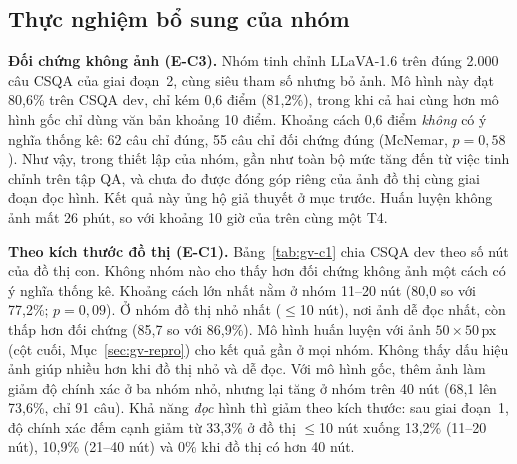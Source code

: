 \subsection{Thực nghiệm bổ sung của nhóm}
\textbf{Đối chứng không ảnh (E-C3).} Nhóm tinh chỉnh LLaVA-1.6 trên đúng 2.000 câu CSQA của giai đoạn~2, cùng siêu tham số nhưng bỏ ảnh. Mô hình này đạt 80,6\% trên CSQA dev, chỉ kém \GV{} 0,6 điểm (81,2\%), trong khi cả hai cùng hơn mô hình gốc chỉ dùng văn bản khoảng 10 điểm. Khoảng cách 0,6 điểm \emph{không} có ý nghĩa thống kê: 62 câu chỉ \GV{} đúng, 55 câu chỉ đối chứng đúng (McNemar, $p=0{,}58$). Như vậy, trong thiết lập của nhóm, gần như toàn bộ mức tăng đến từ việc tinh chỉnh trên tập QA, và chưa đo được đóng góp riêng của ảnh đồ thị cùng giai đoạn đọc hình. Kết quả này ủng hộ giả thuyết ở mục trước. Huấn luyện không ảnh mất 26 phút, so với khoảng 10 giờ của \GV{} trên cùng một T4.

\textbf{Theo kích thước đồ thị (E-C1).} Bảng~\ref{tab:gv-c1} chia CSQA dev theo số nút của đồ thị con. Không nhóm nào cho thấy \GV{} hơn đối chứng không ảnh một cách có ý nghĩa thống kê. Khoảng cách lớn nhất nằm ở nhóm 11--20 nút (80,0 so với 77,2\%; $p=0{,}09$). Ở nhóm đồ thị nhỏ nhất ($\le$10 nút), nơi ảnh dễ đọc nhất, \GV{} còn thấp hơn đối chứng (85,7 so với 86,9\%). Mô hình huấn luyện với ảnh $50\times50$\,px (cột cuối, Mục~\ref{sec:gv-repro}) cho kết quả gần \GV{} ở mọi nhóm. Không thấy dấu hiệu ảnh giúp nhiều hơn khi đồ thị nhỏ và dễ đọc. Với mô hình gốc, thêm ảnh làm giảm độ chính xác ở ba nhóm nhỏ, nhưng lại tăng ở nhóm trên 40 nút (68,1 lên 73,6\%, chỉ 91 câu). Khả năng \emph{đọc} hình thì giảm theo kích thước: sau giai đoạn~1, độ chính xác đếm cạnh giảm từ 33,3\% ở đồ thị $\le$10 nút xuống 13,2\% (11--20 nút), 10,9\% (21--40 nút) và 0\% khi đồ thị có hơn 40 nút.

\begin{table}[t]
\centering
\caption{Độ chính xác CSQA dev theo số nút của đồ thị con (\%)}
\label{tab:gv-c1}
\small
\setlength{\tabcolsep}{3pt}
\end{table}

